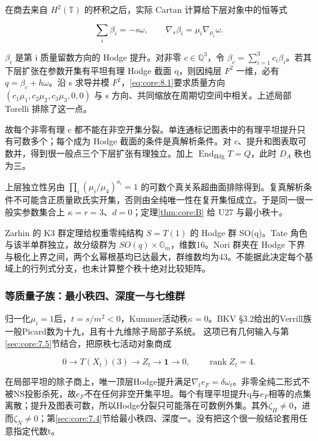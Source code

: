\documentclass[11pt,a4paper,oneside]{ctexart}
\theoremstyle{cnplain}
\theoremstyle{definition}
\theoremstyle{remark}
\numberwithin{equation}{section}
\begin{document}
在商去来自 \(H^2(\mathbb T)\) 的杯积之后，实际 Cartan 计算给下层对象中的恒等式

\begin{equation}
\sum_i\beta_i=-s\omega,\qquad
             \nabla_s\beta_i=\mu_i\nabla_{\mu_i}\omega. \label{eq:core:8.1}
\end{equation}

\(\beta _i\) 是第 i 质量留数方向的 Hodge 提升。对非零 \(c\in\mathbb Q^3\)，令 \(\beta_c=\sum_{i=1}^3c_i\beta_i\)。若其下层扩张在参数开集有平坦有理 Hodge 截面 q，则因纯层 \(F^2\) 一维，必有 \(q=\beta _c+h\omega \)。沿 s 求导并模 \(F^2\)，\eqref{eq:core:8.1}要求质量方向 \((c_1\mu_1,c_2\mu_2,c_3\mu_3,0,0)\) 与 s 方向、共同缩放在周期切空间中相关。上述局部 Torelli 排除了这一点。

故每个非零有理 c 都不能在非空开集分裂。单连通标记图表中的有理平坦提升只有可数多个；每个成为 Hodge 截面的条件是真解析条件。对 c、提升和图表取可数并，得到很一般点三个下层扩张有理独立。加上 \(\operatorname{End}_{\mathrm{Hdg}} T=Q\)，此时 \(D_A\) 秩也为三。

上层独立性另由 \(\prod_i(\mu_i/\mu_4)^{a_i}=1\) 的可数个真关系超曲面排除得到。复真解析条件不可能含正质量欧氏实开集，否则由全纯唯一性在复开集恒成立。于是同一很一般实参数集合上 \(\kappa =r=3\)、\(d=0\)；定理\ref{thm:core:B} 给 U27 与最小秩十。

Zarhin 的 K3 群定理\cite{zarhin}给权重零纯结构 \(S=T(1)\) 的 Hodge 群 SO(q)。Tate 角色与该半单群独立，故分级群为 \(SO(q)\times \mathbb G_m\)，维数16。Nori 群夹在 Hodge 下界与极化上界之间，两个幺幂根基均已达最大，群维数均为43。不能据此决定每个基域上的行列式分支，也未计算整个秩十绝对比较矩阵。

\subsubsection{等质量子族：最小秩四、深度一与七维群}\label{sec:core:8.1}

归一化\(\mu _i=1\)后，\(t=s/m^{2}<0\)，Kummer活动秩\(\kappa =0\)。BKV §3.2给出的Verrill族一般Picard数为十九，且有十九维除子局部子系统。\cite{bkv} 这项已有几何输入与第\ref{sec:core:7.5}节结合，把原秩七活动对象商成

\begin{equation}
0\to T(X_t)(3)\to Z_t\to\mathbf1\to0,
                    \qquad \operatorname{rank}Z_t=4.
\end{equation}

在局部平坦的除子商上，唯一顶层Hodge提升满足\(\nabla _t e_F=\delta \omega _t\)。非零全纯二形式不被NS投影杀死，故\(e_F\)不在任何非空开集平坦。每个有理平坦提升q与\(e_F\)相等的点集离散；提升及图表可数，所以Hodge分裂只可能落在可数例外集。其外\(\zeta _H\ne 0\)，进而\(\zeta _N\ne 0\)；第\ref{sec:core:7.4}节给最小秩四、深度一。没有把这个很一般结论套用任意指定代数t。
\end{document}
